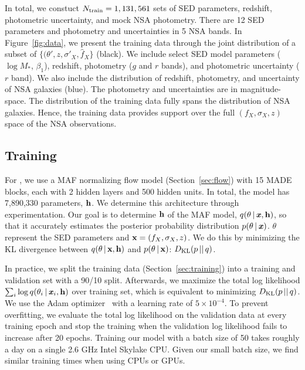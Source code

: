 In total, we constuct $N_{\rm train} = 1,131,561$ sets of SED parameters,
redshift, photometric uncertainty, and mock NSA photometry. 
There are 12 SED parameters and photometry and uncertainties in 5 NSA bands. 
In Figure~\ref{fig:data}, we present the training data through the joint
distribution of a subset of $\{(\theta', z, \sigma'_X, \hat{f}_X \}$ (black).
We include select SED model parameters ($\log M_*$, $\beta_1$), redshift,
photometry ($g$ and $r$ bands), and photometric uncertainty ($r$ band).
We also include the distribution of redshift, photometry, and uncertainty of
NSA galaxies (blue).
The photometry and uncertainties are in magnitude-space. 
The distribution of the training data fully spans the distribution of NSA
galaxies.
Hence, the training data provides support over the full $(f_X, \sigma_X, z)$
space of the NSA observations. 

\subsection{Training \sedflow} \label{sec:anpe_train}
For \sedflow, we use a MAF normalizing flow model (Section~\ref{sec:flow}) with 
15 MADE blocks, each with 2 hidden layers and 500 hidden units.
In total, the model has 7,890,330 parameters, ${\bf h}$. 
We determine this architecture through experimentation. 
Our goal is to determine ${\bf h}$ of the MAF model, 
$q(\theta\,|\,\textbf{\textit{x}}, {\bf h})$, so that it accurately estimates the
posterior probability distribution $p(\theta\,|\,\textbf{\textit{x}})$. 
$\theta$ represent the SED parameters and ${\bf x} = (f_X, \sigma_X, z)$.
We do this by minimizing the KL divergence between 
$q(\theta\,|\,{\bf x}, {\bf h})$ and $p(\theta\,|\,{\bf x})$:
$D_{\rm KL} (p\,||\,q)$. 

In practice, we split the training data (Section~\ref{sec:training}) into a
training and validation set with a 90/10 split. 
Afterwards, we maximize the total log likelihood $\sum_i \log q(\theta_i\,|\,
\textbf{\textit{x}}_i, \bf{h})$ over training set, which is equivalent to minimizing 
$D_{\rm KL} (p\,||\,q)$.
We use the {\sc Adam} optimizer~\citep{kingma2017} with a learning rate of $5\times10^{-4}$. 
To prevent overfitting, we evaluate the total log likelihood on the validation
data at every training epoch and stop the training when the validation log
likelihood fails to increase after 20 epochs.  
Training our model with a batch size of 50 takes roughly a day on a single 2.6
GHz Intel Skylake CPU. 
Given our small batch size, we find similar training times when using CPUs or
GPUs. 
